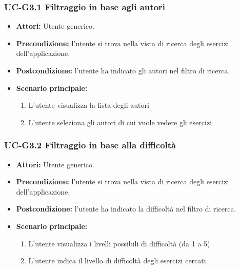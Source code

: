 \subsubsection{UC-G3.1 Filtraggio in base agli autori}
	\begin{itemize}
		\item \textbf{Attori:} Utente generico.
		\item \textbf{Precondizione: } l'utente si trova nella vista di ricerca degli esercizi dell'applicazione.
		\item \textbf{Postcondizione: } l'utente ha indicato gli autori nel filtro di ricerca.
		\item \textbf{Scenario principale:}
		\begin{enumerate}
			\item L'utente visualizza la lista degli autori
			\item L'utente seleziona gli autori di cui vuole vedere gli esercizi
		\end{enumerate}
	\end{itemize}

\subsubsection{UC-G3.2 Filtraggio in base alla difficoltà}
	\begin{itemize}
		\item \textbf{Attori:} Utente generico.
		\item \textbf{Precondizione: } l'utente si trova nella vista di ricerca degli esercizi dell'applicazione.
		\item \textbf{Postcondizione: } l'utente ha indicato la difficoltà nel filtro di ricerca.
		\item \textbf{Scenario principale:}
		\begin{enumerate}
			\item L'utente visualizza i livelli possibili di difficoltà (da 1 a 5)
			\item L'utente indica il livello di difficoltà degli esercizi cercati
		\end{enumerate}
	\end{itemize}

